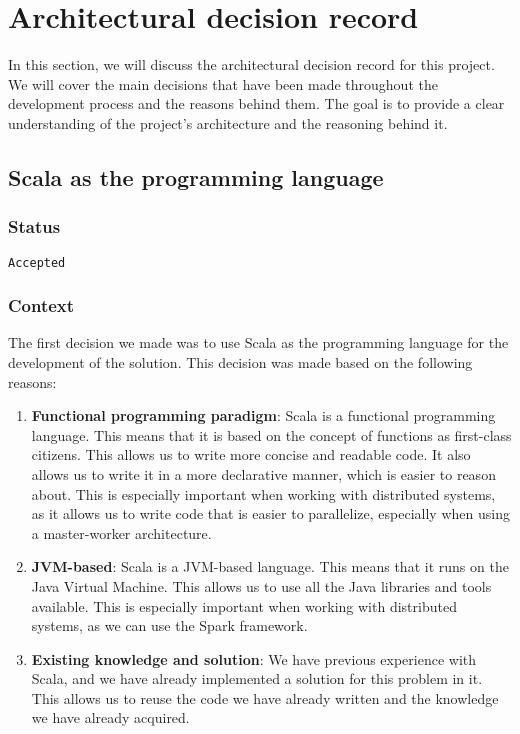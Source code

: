 \section{Architectural decision record}

In this section, we will discuss the architectural decision record for this project. We will cover the main decisions that have been made throughout the development process and the reasons behind them. The goal is to provide a clear understanding of the project's architecture and the reasoning behind it.

\subsection{Scala as the programming language}

\subsubsection{Status}

\texttt{Accepted}

\subsubsection{Context}

The first decision we made was to use Scala as the programming language for the development of the solution. This decision was made based on the following reasons:

\begin{enumerate}
    \itemsep0.5em
    \item \textbf{Functional programming paradigm}: Scala is a functional programming language. This means that it is based on the concept of functions as first-class citizens. This allows us to write more concise and readable code. It also allows us to write it in a more declarative manner, which is easier to reason about. This is especially important when working with distributed systems, as it allows us to write code that is easier to parallelize, especially when using a master-worker architecture.
    \item \textbf{JVM-based}: Scala is a JVM-based language. This means that it runs on the Java Virtual Machine. This allows us to use all the Java libraries and tools available. This is especially important when working with distributed systems, as we can use the Spark framework.
    \item \textbf{Existing knowledge and solution}: We have previous experience with Scala, and we have already implemented a solution for this problem in it. This allows us to reuse the code we have already written and the knowledge we have already acquired.
\end{enumerate}

